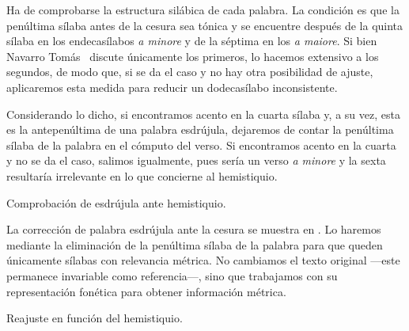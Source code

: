 Ha de comprobarse la estructura silábica de cada palabra. La condición es que la penúltima sílaba antes de la cesura sea tónica y se encuentre después de la quinta sílaba en los endecasílabos \textit{a minore} y de la séptima en los \textit{a maiore}. Si bien Navarro Tomás~\parencite*[40]{navarrotomas1991} discute únicamente los primeros, lo hacemos extensivo a los segundos, de modo que, si se da el caso y no hay otra posibilidad de ajuste, aplicaremos esta medida para reducir un dodecasílabo inconsistente.

Considerando lo dicho, si encontramos acento en la cuarta sílaba y, a su vez, esta es la antepenúltima de una palabra esdrújula, dejaremos de contar la penúltima sílaba de la palabra en el cómputo del verso. Si encontramos acento en la cuarta y no se da el caso, salimos igualmente, pues sería un verso \textit{a minore} y la sexta resultaría irrelevante en lo que concierne al hemistiquio.

\begin{algorithm}[!ht]
	\caption{Comprobación de esdrújula ante hemistiquio.}\label{list:VerSeMetre7}
\end{algorithm}

La corrección de palabra esdrújula ante la cesura se muestra en . Lo haremos mediante la eliminación de la penúltima sílaba de la palabra para que queden únicamente sílabas con relevancia métrica. No cambiamos el texto original —este permanece invariable como referencia—, sino que trabajamos con su representación fonética para obtener información métrica.

\begin{algorithm}[!ht]
	\caption{Reajuste en función del hemistiquio.}\label{list:VerSeMetre15}
\end{algorithm}

